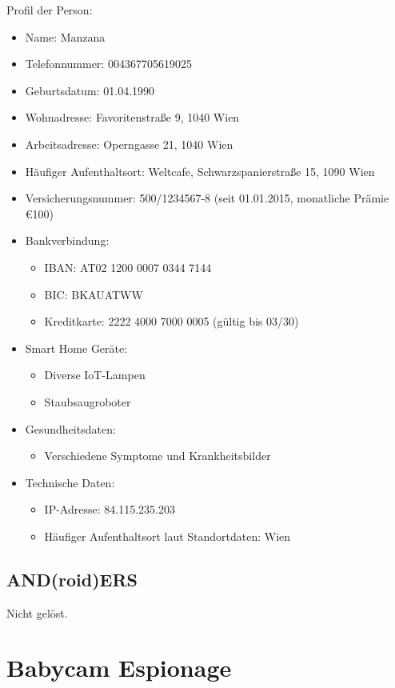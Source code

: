 \documentclass[12pt,a4paper,titlepage,oneside]{scrartcl}
\begin{document}
Profil der Person:
\begin{itemize}
  \item Name: Manzana
  \item Telefonnummer: 004367705619025
  \item Geburtsdatum: 01.04.1990
  \item Wohnadresse: Favoritenstraße 9, 1040 Wien
  \item Arbeitsadresse: Operngasse 21, 1040 Wien
  \item Häufiger Aufenthaltsort: Weltcafe, Schwarzspanierstraße 15, 1090 Wien
  \item Versicherungsnummer: 500/1234567-8 (seit 01.01.2015, monatliche Prämie €100)
  \item Bankverbindung:
  \begin{itemize}
  \item IBAN: AT02 1200 0007 0344 7144
  \item BIC: BKAUATWW
  \item Kreditkarte: 2222 4000 7000 0005 (gültig bis 03/30)
  \end{itemize}
  \item Smart Home Geräte:
  \begin{itemize}
  \item Diverse IoT-Lampen
  \item Staubsaugroboter
  \end{itemize}
  \item Gesundheitsdaten:
  \begin{itemize}
  \item Verschiedene Symptome und Krankheitsbilder
  \end{itemize}
  \item Technische Daten:
  \begin{itemize}
  \item IP-Adresse: 84.115.235.203
  \item Häufiger Aufenthaltsort laut Standortdaten: Wien
  \end{itemize}
  \end{itemize}


\subsection{AND(roid)ERS}
Nicht gelöst.


\section{Babycam Espionage}
\end{document}
